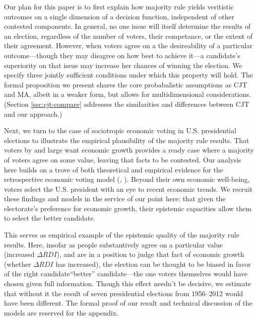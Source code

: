 \documentclass[11pt]{article}
\begin{document}
Our plan for this paper is to first explain how majority rule
yields veritistic outcomes on a single dimension of a decision
function, independent of other contested components.
In general, no one issue will itself determine the results of an election, regardless of the number of voters, their competance, or the extent of their agreement.
However, when voters agree on a the desireability of a particular outcome---though they may disagree on how best to achieve it---a candidate's superiority on that issue may increase her chances of winning the election. 
We specify three jointly sufficient conditions under which this property will hold. 
The formal proposition we present shares the core probabalistic assumptions as CJT and MA, albeit in a weaker form, but allows for multidimensional considerations. (Section \ref{sec:cjt-compare} addresses the similarities and differences between CJT and our approach.)

Next, we turn to the case of sociotropic economic voting in U.S. presidential elections to illustrate the empirical plausibility of the majority rule results. That voters by and large want economic growth provides a ready case where a majority of voters agree on some value, leaving that facts to be contested.
 Our analysis here builds on a trove of both theoretical and empirical evidence for the retrospective economic voting model (\cite{Duch2008}, \cite{Revisited09}). Beyond their own economic well-being, voters select the U.S. president with an eye to  recent economic trends. We recruit these findings and models in the service of our point here: that given the electorate's preference for economic growth, their epistemic capacities allow them to select the better candidate.
 


This serves as empirical example of the epistemic quality of the majority rule results. Here, insofar as people substantively agree on a particular value (increased $\Delta RDI$), and are in a position to judge that fact of economic growth (whether $\Delta RDI$ has increased), the election can be thought to be biased in favor of the right candidate``better'' candidate---the one voters themselves would have chosen given full information. %
Though this effect needn't be decisive, we estimate that without it the result of seven presidential elections from 1956--2012 would have been different. The formal proof of our result and technical discussion of the models are reserved for the appendix.
\end{document}
